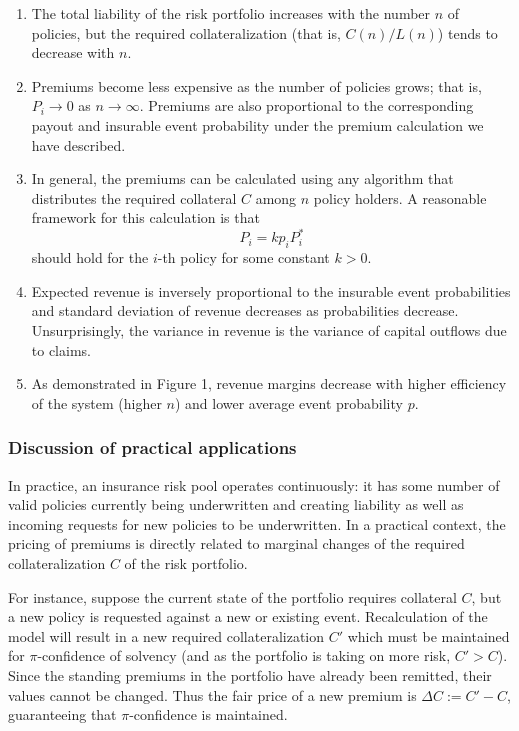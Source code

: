 \documentclass[12pt,a4paper]{article}
\begin{document}
\begin{enumerate}
    \item The total liability of the risk portfolio increases with the number $n$ of policies, but the required collateralization (that is, $C(n)/L(n)$) tends to decrease with $n$.
    \item Premiums become less expensive as the number of policies grows; that is, $P_i\to 0$ as $n\to\infty$. Premiums are also proportional to the corresponding payout and insurable event probability under the premium calculation we have described.
    \item In general, the premiums can be calculated using any algorithm that distributes the required collateral $C$ among $n$ policy holders. A reasonable framework for this calculation is that $$P_i = kp_iP_i^*$$ should hold for the $i$-th policy for some constant $k > 0$.
    \item Expected revenue is inversely proportional to the insurable event probabilities and standard deviation of revenue decreases as probabilities decrease. Unsurprisingly, the variance in revenue is the variance of capital outflows due to claims.
    \item As demonstrated in Figure 1, revenue margins decrease with higher efficiency of the system (higher $n$) and lower average event probability $p$.
\end{enumerate}

\subsubsection{Discussion of practical applications}

In practice, an insurance risk pool operates continuously: it has some number of valid policies currently being underwritten and creating liability as well as incoming requests for new policies to be underwritten. In a practical context, the pricing of premiums is directly related to marginal changes of the required collateralization $C$ of the risk portfolio.

For instance, suppose the current state of the portfolio requires collateral $C$, but a new policy is requested against a new or existing event. Recalculation of the model will result in a new required collateralization $C'$ which must be maintained for $\pi$-confidence of solvency (and as the portfolio is taking on more risk, $C'>C$). Since the standing premiums in the portfolio have already been remitted, their values cannot be changed. Thus the fair price of a new premium is $\Delta C := C' - C$, guaranteeing that $\pi$-confidence is maintained.
\end{document}
